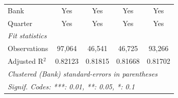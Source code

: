 \begin{tabular}{lcccc}
   Bank                                   & Yes             & Yes            & Yes             & Yes\\  
   Quarter                                & Yes             & Yes            & Yes             & Yes\\  
   \midrule
   \emph{Fit statistics}\\
   Observations                           & 97,064          & 46,541         & 46,725          & 93,266\\  
   Adjusted R$^2$                         & 0.82123         & 0.81815        & 0.81668         & 0.81702\\  
   \midrule \midrule
   \multicolumn{5}{l}{\emph{Clustered (Bank) standard-errors in parentheses}}\\
   \multicolumn{5}{l}{\emph{Signif. Codes: ***: 0.01, **: 0.05, *: 0.1}}\\
\end{tabular}
\par\endgroup


